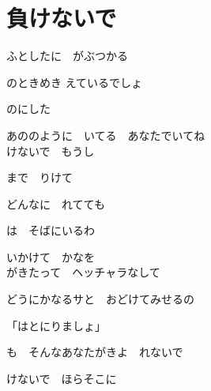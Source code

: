 \section{ 負けないで}

\large{

ふとしたに　がぶつかる

のときめき  えているでしょ

のにした

あののように　いてる　あなたでいてね
\\

けないで　もうし

まで　りけて

どんなに　れてても

は　そばにいるわ

いかけて　かなを
\\

がきたって　ヘッチャラなして

どうにかなるサと　おどけてみせるの

「はとにりましょ」

も　そんなあなたがきよ　れないで
\\


けないで　ほらそこに

}
